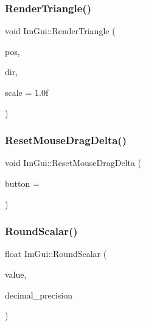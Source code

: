 \mbox{\label{namespace_im_gui_ad11a82904a65722d285230567af826b8}} 
\subsubsection{\texorpdfstring{Render\+Triangle()}{RenderTriangle()}}
{\footnotesize\ttfamily void Im\+Gui\+::\+Render\+Triangle (\begin{DoxyParamCaption}\item[{\mbox{\hyperlink{struct_im_vec2}{Im\+Vec2}}}]{pos,  }\item[{\mbox{\hyperlink{imgui__internal_8h_a4b8427c5153ae1d43278dc397d809335}{Im\+Gui\+Dir}}}]{dir,  }\item[{float}]{scale = {\ttfamily 1.0f} }\end{DoxyParamCaption})}

\mbox{\label{namespace_im_gui_aa03f31a184cafdf506feb2e8ba07f91e}} 
\subsubsection{\texorpdfstring{Reset\+Mouse\+Drag\+Delta()}{ResetMouseDragDelta()}}
{\footnotesize\ttfamily void Im\+Gui\+::\+Reset\+Mouse\+Drag\+Delta (\begin{DoxyParamCaption}\item[{int}]{button = {} }\end{DoxyParamCaption})}

\mbox{\label{namespace_im_gui_ab1826c569a8f3296b9723a2148013d28}} 
\subsubsection{\texorpdfstring{Round\+Scalar()}{RoundScalar()}}
{\footnotesize\ttfamily float Im\+Gui\+::\+Round\+Scalar (\begin{DoxyParamCaption}\item[{float}]{value,  }\item[{int}]{decimal\+\_\+precision }\end{DoxyParamCaption})}

